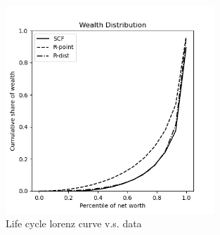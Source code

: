  \hypertarget{LCUnif}{}
 \begin{figure}[H]
   \centering
   \includegraphics[width=0.7\textwidth]{./Figures/LCUnif.png}
   \caption{Life cycle lorenz curve v.s. data}
    \label{fig:LCUnif}
  \end{figure}